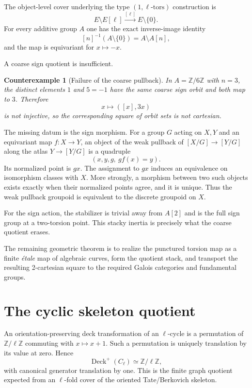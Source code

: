 \documentclass[11pt]{article}
\newtheorem{counterexample}[theorem]{Counterexample}
\newcommand{\Z}{\mathbb Z}
\begin{document}
The object-level cover underlying the type $(1,\ell\text{-tors})$ construction
is
\[
 E\setminus E[\ell]\xrightarrow{[\ell]} E\setminus\{0\}.
\]
For every additive group $A$ one has the exact inverse-image identity
\[
 [n]^{-1}(A\setminus\{0\})=A\setminus A[n],
\]
and the map is equivariant for $x\mapsto-x$.

A coarse sign quotient is insufficient.

\begin{counterexample}[Failure of the coarse pullback]
In $A=\Z/6\Z$ with $n=3$, the distinct elements $1$ and $5=-1$ have the same
coarse sign orbit and both map to $3$.  Therefore
\[
 x\longmapsto([x],3x)
\]
is not injective, so the corresponding square of orbit sets is not
cartesian.
\end{counterexample}

The missing datum is the sign morphism.  For a group $G$ acting on $X,Y$ and
an equivariant map $f:X\to Y$, an object of the weak pullback of
$[X/G]\to[Y/G]$ along the atlas $Y\to[Y/G]$ is a quadruple
\[
 (x,y,g,\ g f(x)=y).
\]
Its normalized point is $gx$.  The assignment to $gx$ induces an equivalence
on isomorphism classes with $X$.  More strongly, a morphism between two such
objects exists exactly when their normalized points agree, and it is unique.
Thus the weak pullback groupoid is equivalent to the discrete groupoid on
$X$.

For the sign action, the stabilizer is trivial away from $A[2]$ and is the
full sign group at a two-torsion point.  This stacky inertia is precisely what
the coarse quotient erases.

The remaining geometric theorem is to realize the punctured torsion map as a
finite \emph{\'etale} map of algebraic curves, form the quotient stack, and
transport the resulting 2-cartesian square to the required Galois categories
and fundamental groups.

\section{The cyclic skeleton quotient}

An orientation-preserving deck transformation of an $\ell$-cycle is a
permutation of $\Z/\ell\Z$ commuting with $x\mapsto x+1$.  Such a permutation
is uniquely translation by its value at zero.  Hence
\[
 \operatorname{Deck}^+(C_\ell)\simeq\Z/\ell\Z,
\]
with canonical generator translation by one.  This is the finite graph
quotient expected from an $\ell$-fold cover of the oriented Tate/Berkovich
skeleton.
\end{document}
